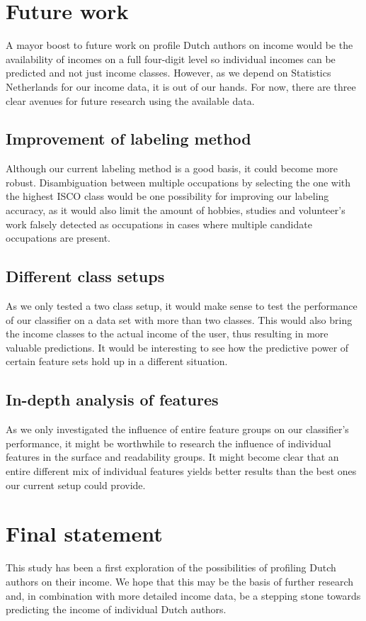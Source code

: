 \documentclass[
10pt, %
a4paper, %
oneside, %
headinclude,footinclude, %
] {book}%
\begin{document}
\section{Future work}
A mayor boost to future work on profile Dutch authors on income would be the availability of incomes on a full four-digit level so individual incomes can be predicted and not just income classes. However, as we depend on Statistics Netherlands for our income data, it is out of our hands. For now, there are three clear avenues for future research using the available data.

\subsection{Improvement of labeling method}
Although our current labeling method is a good basis, it could become more robust. Disambiguation between multiple occupations by selecting the one with the highest ISCO class would be one possibility for improving our labeling accuracy, as it would also limit the amount of hobbies, studies and volunteer's work falsely detected as occupations in cases where multiple candidate occupations are present.

\subsection{Different class setups}
As we only tested a two class setup, it would make sense to test the performance of our classifier on a data set with more than two classes. This would also bring the income classes to the actual income of the user, thus resulting in more valuable predictions. It would be interesting to see how the predictive power of certain feature sets hold up in a different situation.

\subsection{In-depth analysis of features}
As we only investigated the influence of entire feature groups on our classifier's performance, it might be worthwhile to research the influence of individual features in the surface and readability groups. It might become clear that an entire different mix of individual features yields better results than the best ones our current setup could provide.

\section{Final statement}
This study has been a first exploration of the possibilities of profiling Dutch authors on their income. We hope that this may be the basis of further research and, in combination with more detailed income data, be a stepping stone towards predicting the income of individual Dutch authors. 



 

\end{document}
